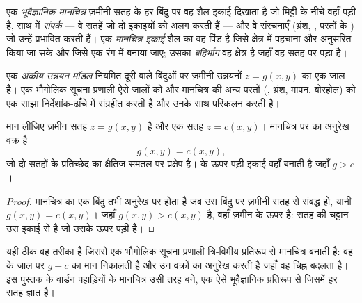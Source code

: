 \begin{definition}[भूवैज्ञानिक मानचित्र]\label{def:b1:geological-maps:geological-map}
एक \emph{भूवैज्ञानिक मानचित्र} ज़मीनी सतह के हर बिंदु पर वह शैल-इकाई दिखाता है जो
मिट्टी के नीचे वहाँ पड़ी है, साथ में \emph{संपर्क} --- वे सतहें जो दो इकाइयों को
अलग करती हैं --- और वे संरचनाएँ (भ्रंश, , परतों के ) जो उन्हें प्रभावित करती हैं। एक
\emph{मानचित्र इकाई} शैल का वह पिंड है जिसे क्षेत्र में पहचाना और अनुसरित किया जा सके और
जिसे एक रंग में बनाया जाए; उसका \emph{बहिर्भाग} वह क्षेत्र है जहाँ वह सतह पर पड़ा है।
\end{definition}

\begin{definition}[अंकीय उन्नयन मॉडल]\label{def:b1:geological-maps:dem}
एक \emph{अंकीय उन्नयन मॉडल} नियमित दूरी वाले बिंदुओं पर ज़मीनी उन्नयनों $z = g(x,y)$
का एक जाल है। एक भौगोलिक सूचना प्रणाली ऐसे जालों को और मानचित्र की अन्य परतों (, भ्रंश, मापन,
बोरहोल) को एक साझा निर्देशांक-ढाँचे में संग्रहीत करती है और उनके साथ परिकलन करती है।
\end{definition}

\begin{proposition}[एक संपर्क का बहिर्भाग]\label{prop:b1:geological-maps:intersection}
मान लीजिए ज़मीन सतह $z = g(x,y)$ है और एक  सतह $z = c(x,y)$। मानचित्र पर  का अनुरेख वक्र है
\[
  g(x,y) = c(x,y),
\]
जो दो सतहों के प्रतिच्छेद का क्षैतिज समतल पर प्रक्षेप है।  के ऊपर पड़ी इकाई वहाँ  बनाती है
जहाँ $g > c$।
\end{proposition}

\begin{proof}
मानचित्र का एक बिंदु तभी अनुरेख पर होता है जब उस बिंदु पर ज़मीनी सतह  से संबद्ध हो, यानी
$g(x,y) = c(x,y)$। जहाँ $g(x,y) > c(x,y)$ है, वहाँ ज़मीन  के ऊपर है: सतह की चट्टान उस इकाई से है जो
उसके ऊपर पड़ी है।
\end{proof}

\begin{remark}[इस पुस्तक के मानचित्र कैसे बने]\label{rem:b1:geological-maps:computed}
यही ठीक वह तरीका है जिससे एक भौगोलिक सूचना प्रणाली त्रि-विमीय प्रतिरूप से मानचित्र बनाती है: वह  के जाल पर $g - c$ का मान निकालती है और उन वक्रों का अनुरेख करती है जहाँ वह चिह्न बदलता है।
इस पुस्तक के वार्डन पहाड़ियों के मानचित्र उसी तरह बने, एक ऐसे भूवैज्ञानिक प्रतिरूप से जिसमें हर सतह ज्ञात है।
\end{remark}

